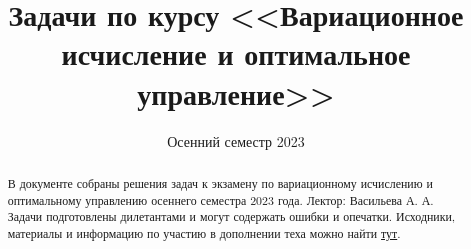 \documentclass[a4paper]{article}
\date{Осенний семестр 2023}
\title{Задачи по курсу <<Вариационное исчисление и оптимальное управление>>}
\theoremstyle{definition}
\begin{document}
\begin{titlepage}
  \maketitle
  
  \begin{abstract}
    В документе собраны решения задач к экзамену по вариационному исчислению и оптимальному управлению
    осеннего семестра 2023 года. Лектор: Васильева А. А. 
    Задачи подготовлены дилетантами и могут содержать ошибки и опечатки. Исходники, материалы
    и информацию по участию в дополнении теха можно найти
    \href{https://github.com/VsevolodZaostrovsky/MSUVariationalTasks}{тут}.
  \end{abstract}
  
\end{titlepage}






























\end{document}
